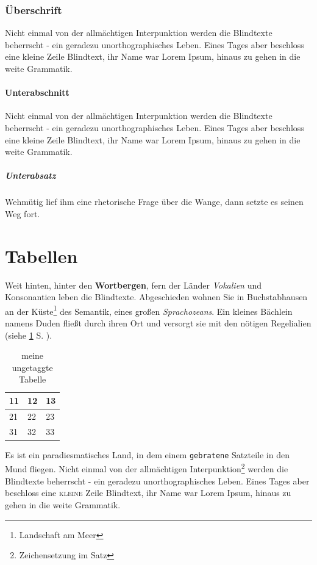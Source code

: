 \documentclass[%
	12pt,%
	a4paper,%
	oneside,%
	listof=totoc,
 	index=totoc,
	bibliography = totoc,
	parskip = half,%
	chapterprefix=false,%
	appendixprefix, %
headings=small,%
]{scrreprt}
\newcommand{\thead}[1]{\textbf{#1}}
\begin{document}
\subsection*{Überschrift}
Nicht einmal von der allmächtigen Interpunktion werden die Blindtexte beherrscht - ein geradezu unorthographisches Leben. Eines Tages aber beschloss eine kleine Zeile Blindtext, ihr Name war Lorem Ipsum, hinaus zu gehen in die weite Grammatik.

\subsubsection*{Unterabschnitt}
Nicht einmal von der allmächtigen Interpunktion werden die Blindtexte beherrscht - ein geradezu unorthographisches Leben. Eines Tages aber beschloss eine kleine Zeile Blindtext, ihr Name war Lorem Ipsum, hinaus zu gehen in die weite Grammatik.

\paragraph*{Unterabsatz}
Wehmütig lief ihm eine rhetorische Frage über die Wange, dann setzte es seinen Weg fort.

\chapter{Tabellen}
\label{sec:Tabellen}

Weit hinten, hinter den \textbf{Wortbergen}, fern der Länder \textit{Vokalien} und Konsonantien leben die Blindtexte. Abgeschieden wohnen Sie in Buchstabhausen an der Küste\footnote{Landschaft am Meer}
des Semantik, eines großen \textsl{Sprachozeans}. Ein kleines Bächlein namens Duden fließt durch ihren Ort und versorgt sie mit den nötigen Regelialien (siehe \ref{sec:Tabellen} S. \pageref{sec:Tabellen}).

\begin{table}[htbp]
	\centering
		\begin{tabular}{l|l l}
			\thead{11} & \thead{12} & \thead{13} \\ \hline
			21 & 22 & 23 \\
			31 & 32 & 33
		\end{tabular}
	\caption{meine ungetaggte Tabelle}
	\label{tab:meineUngetaggteTabelle}
\end{table}

Es ist ein paradiesmatisches Land, in dem einem \texttt{gebratene} Satzteile in den Mund fliegen. Nicht einmal von der allmächtigen Interpunktion\footnote{Zeichensetzung im Satz} werden die Blindtexte beherrscht - ein geradezu unorthographisches Leben. Eines Tages aber beschloss eine \textsc{kleine} Zeile Blindtext, ihr Name war Lorem Ipsum, hinaus zu gehen in die weite Grammatik.
\end{document}
